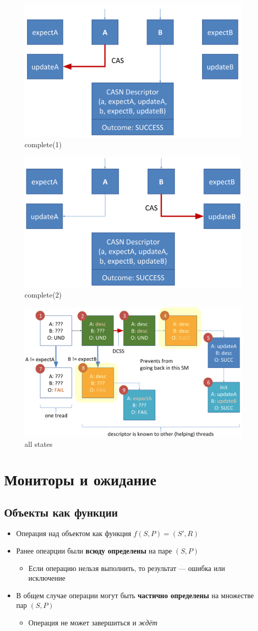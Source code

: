 \documentclass[10pt,a4paper,oneside,titlepage]{article}
\theoremstyle{plain}
\theoremstyle{defenition}
\begin{document}
\begin{figure}[h!]
	\centering
	\includegraphics[width=0.4\linewidth]{pictures/CASN5}
	\caption{complete(1)}
	\label{fig:casn5}
\end{figure}

\begin{figure}[h!]
	\centering
	\includegraphics[width=0.4\linewidth]{pictures/CASN6}
	\caption{complete(2)}
	\label{fig:casn6}
\end{figure}

\begin{figure}[h!]
	\centering
	\includegraphics[width=0.5\linewidth]{pictures/CASN7}
	\caption{all states}
	\label{fig:casn7}
\end{figure}

\section{Мониторы и ожидание}

\subsection{Объекты как функции}
\begin{itemize}
	\item Операция над объектом как функция $f(S, P)=(S', R)$
	\item Ранее опеарции были {\bfseries всюду определены} на паре $(S, P)$
	\begin{itemize}
		\item Если операцию нельзя выполнить, то результат --- ошибка или исключение
	\end{itemize}
    \item В общем случае операции могут быть {\bfseries частично определены} на множестве пар $(S, P)$
    \begin{itemize}
    	\item Операция не может завершиться и \emph{ждёт}
    \end{itemize}
\end{itemize}
\end{document}
